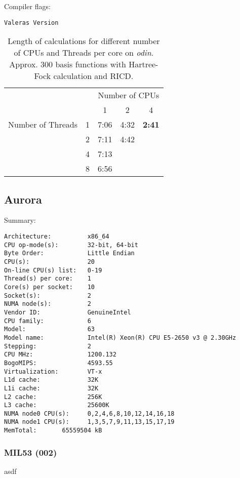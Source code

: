 \documentclass[12pt,a4paper,bibliography=totocnumbered,listof=totocnumbered]{scrartcl}
\begin{document}
Compiler flags:
\begin{verbatim}
Valeras Version
\end{verbatim}
\begin{table}[H]
    \caption{Length of calculations for different number of CPUs and Threads per core on \emph{odin}. Approx. 300 basis functions with Hartree-Fock calculation and RICD.}
    \label{T:duration}
    \begin{tabular}{ccccc}
        \toprule
        &     & \multicolumn{3}{c}{Number of CPUs} \\
        \cmidrule{3-5}
        &         &    1     &     2     &    4     \\ 
        \midrule
        Number of Threads    &   1           &   7:06   &   4:32     &    \textbf{2:41}\\ 
                             &   2           &   7:11   &   4:42     &         \\ 
                             &   4           &   7:13   &            &         \\ 
                             &   8           &   6:56   &            &         \\ 
        \bottomrule
    \end{tabular}
\end{table}


\subsection{Aurora}

Summary:
\begin{verbatim}
Architecture:          x86_64
CPU op-mode(s):        32-bit, 64-bit
Byte Order:            Little Endian
CPU(s):                20
On-line CPU(s) list:   0-19
Thread(s) per core:    1
Core(s) per socket:    10  
Socket(s):             2
NUMA node(s):          2
Vendor ID:             GenuineIntel
CPU family:            6
Model:                 63
Model name:            Intel(R) Xeon(R) CPU E5-2650 v3 @ 2.30GHz
Stepping:              2
CPU MHz:               1200.132
BogoMIPS:              4593.55
Virtualization:        VT-x
L1d cache:             32K
L1i cache:             32K
L2 cache:              256K
L3 cache:              25600K
NUMA node0 CPU(s):     0,2,4,6,8,10,12,14,16,18
NUMA node1 CPU(s):     1,3,5,7,9,11,13,15,17,19
MemTotal:       65559504 kB
\end{verbatim}

\subsubsection{MIL53 (002)}
asdf
\end{document}

